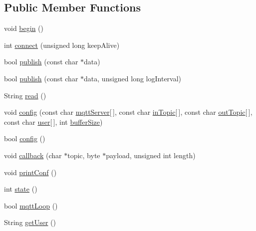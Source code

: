 \subsection*{Public Member Functions}
\begin{DoxyCompactItemize}
\item 
void \hyperlink{classCoolMQTT_ac9248808641ebf3054ed0620ea9d0100}{begin} ()
\item 
int \hyperlink{classCoolMQTT_a50075d0ab23a327ab897fd6adad20eda}{connect} (unsigned long keep\+Alive)
\item 
bool \hyperlink{classCoolMQTT_ace977b3e90ab14b1199fe5c4fb0a13ec}{publish} (const char $\ast$data)
\item 
bool \hyperlink{classCoolMQTT_a613c5e3927ae85bb94fbf648d84d8780}{publish} (const char $\ast$data, unsigned long log\+Interval)
\item 
String \hyperlink{classCoolMQTT_ae3c18f6ae9723746d32765f1c8f176ca}{read} ()
\item 
void \hyperlink{classCoolMQTT_a9b703de4f1358f0ee7a5e8c44979c648}{config} (const char \hyperlink{classCoolMQTT_ab8bb951f87ddbf92db74c2ad16a3e53e}{mqtt\+Server}\mbox{[}$\,$\mbox{]}, const char \hyperlink{classCoolMQTT_a4492f52a441e83cc5151010317fdb52d}{in\+Topic}\mbox{[}$\,$\mbox{]}, const char \hyperlink{classCoolMQTT_a109c786a17b463f9eeba046194279522}{out\+Topic}\mbox{[}$\,$\mbox{]}, const char \hyperlink{classCoolMQTT_a8cd47e45d457f908d4b4390b35aaee83}{user}\mbox{[}$\,$\mbox{]}, int \hyperlink{classCoolMQTT_a7f3cf26b51d6770f216e42c5ef13ca9f}{buffer\+Size})
\item 
bool \hyperlink{classCoolMQTT_a6571671781a505feca9a8a56e256c6bc}{config} ()
\item 
void \hyperlink{classCoolMQTT_a30d82ad665bfb603f46ecdbc290775df}{callback} (char $\ast$topic, byte $\ast$payload, unsigned int length)
\item 
void \hyperlink{classCoolMQTT_a40553a0ad4b5ecf1cb4411ab54ca85fb}{print\+Conf} ()
\item 
int \hyperlink{classCoolMQTT_a5d003307eff78efbd585e42b43b72b6d}{state} ()
\item 
bool \hyperlink{classCoolMQTT_aa5eaae967b562b62cbcf2b8d81f6e5d5}{mqtt\+Loop} ()
\item 
String \hyperlink{classCoolMQTT_a373cc92fca7760d886f02d8a6e5b3f63}{get\+User} ()
\end{DoxyCompactItemize}
